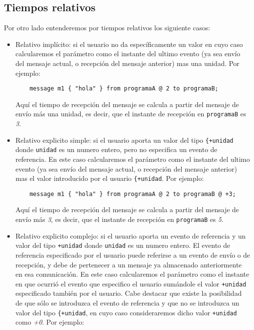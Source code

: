 \subsection{Tiempos relativos}

Por otro lado entenderemos por tiempos relativos los siguiente casos:

\begin{itemize}
\item Relativo implícito: si el usuario no da específicamente un valor
  en cuyo caso calcularemos el parámetro como el instante del ultimo
  evento (ya sea envío del mensaje actual, o recepción del mensaje
  anterior) mas una unidad. Por ejemplo:

  \begin{lstlisting}
    message m1 { "hola" } from programaA @ 2 to programaB;
  \end{lstlisting}

  Aquí el tiempo de recepción del mensaje se calcula a partir del
  mensaje de envío más una unidad, es decir, que el instante de
  recepción en \lstinline{programaB} es \textit{3}.
\item Relativo explicito simple: si el usuario aporta un valor del
  tipo \lstinline{{+unidad} donde \lstinline{unidad} es un numero
  entero, pero no especifica un evento de referencia. En este caso
  calcularemos el parámetro como el instante del ultimo evento (ya
  sea envío del mensaje actual, o recepción del mensaje anterior)
  mas el valor introducido por el usuario \lstinline{{+unidad}. Por  
  ejemplo:
      
  \begin{lstlisting}
    message m1 { "hola" } from programaA @ 2 to programaB @ +3;
  \end{lstlisting}
      
  Aquí el tiempo de recepción del mensaje se calcula a partir del
  mensaje de envío más \textit{3}, es decir, que el instante de
  recepción en \lstinline{programaB} es \textit{5}.
      
\item Relativo explicito complejo: si el usuario aporta un evento de
  referencia y un valor del tipo \lstinline{+unidad} donde
  \lstinline{unidad} es un numero entero. El evento de referencia
  especificado por el usuario puede referirse a un evento de envío o
  de recepción, y debe de pertenecer a un mensaje ya almacenado
  anteriormente en esa comunicación. En este caso calcularemos el
  parámetro como el instante en que ocurrió el evento que especifico
  el usuario sumándole el valor \lstinline{+unidad} especificado
  también por el usuario. Cabe destacar que existe la posibilidad de
  que sólo se introduzca el evento de referencia y que no se
  introduzca un valor del tipo \lstinline{{+unidad}, en cuyo caso
  consideraremos dicho valor \lstinline{+unidad} como \textit{+0}. 
  Por ejemplo:


\end{itemize}
